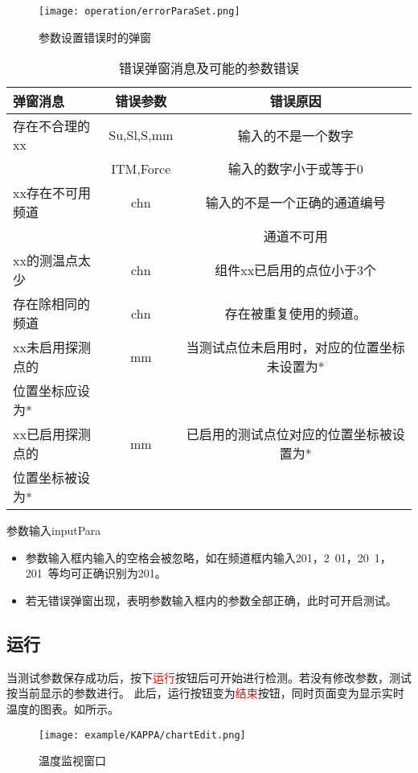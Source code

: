 \begin{figure}[H]
    \centering
    \texttt{[image: operation/errorParaSet.png]}
    \caption{ 参数设置错误时的弹窗 \label{fig:errorParaSet}}
\end{figure}
\begin{table}[htbp]
    \centering
    \caption{ 错误弹窗消息及可能的参数错误 \label{tab:errorInfoNormalUser}}
    \begin{tabular}{@{}lcc@{}}
        \toprule
        弹窗消息                        & 错误参数   & 错误原因                                    \\ \midrule
        存在不合理的xx                  & Su,Sl,S,mm & 输入的不是一个数字                          \\
                                        & ITM,Force  & 输入的数字小于或等于0                       \\
        xx存在不可用频道                & chn        & 输入的不是一个正确的通道编号                \\
                                        &            & 通道不可用                                  \\
        xx的测温点太少                  & chn        & 组件xx已启用的点位小于3个                   \\
        存在除相同的频道                & chn        & 存在被重复使用的频道。                      \\
        xx未启用探测点的 & mm         & 当测试点位未启用时，对应的位置坐标未设置为* \\
        位置坐标应设为*& & \\
        xx已启用探测点的 & mm         & 已启用的测试点位对应的位置坐标被设置为*     \\
        位置坐标被设为* & & \\
        \bottomrule
    \end{tabular}
\end{table}
\begin{tips}{参数输入}{inputPara}
    \begin{itemize}
        \item 参数输入框内输入的空格会被忽略，如在频道框内输入201，2\ 01，20\ 1，201\ 等均可正确识别为201。
        \item 若无错误弹窗出现，表明参数输入框内的参数全部正确，此时可开启测试。
    \end{itemize}
\end{tips}
\subsection{运行}
当测试参数保存成功后，按下\textcolor{red}{运行}按钮后可开始进行检测。若没有修改参数，测试按当前显示的参数进行。
此后，运行按钮变为\textcolor{red}{结束}按钮，同时页面变为显示实时温度的图表。如所示。
\begin{figure}[H]
    \centering
    \texttt{[image: example/KAPPA/chartEdit.png]}
    \caption{ 温度监视窗口 \label{fig:tempChart}}
\end{figure}

